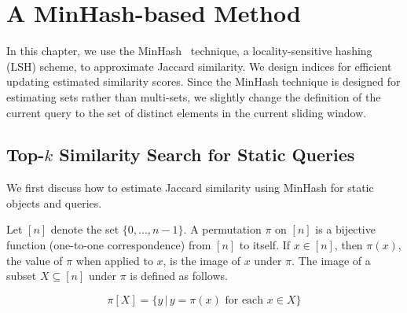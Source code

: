 
%
%

\chapter{A MinHash-based Method}
\label{ch:hashing}

In this chapter, we use the MinHash~\cite{Broder97} technique, a locality-sensitive hashing (LSH) scheme, to approximate Jaccard similarity. We design indices for efficient updating estimated similarity scores. Since the MinHash technique is designed for estimating sets rather than multi-sets, we slightly change the definition of the current query to the set of distinct elements in the current sliding window. 

\section{Top-$k$ Similarity Search for Static Queries}\label{sec:static-minHash}

We first discuss how to estimate Jaccard similarity using MinHash for static objects and queries. 



\begin{definition}\label{def:permutation}
Let $[n]$ denote the set $\{0,\dots,n-1\}$. A permutation $\pi$ on $[n]$ is a bijective function (one-to-one correspondence) from $[n]$ to itself. If $x \in [n]$, then $\pi(x)$, the value of $\pi$ when applied to $x$, is the image of $x$ under $\pi$. The image of a subset $X \subseteq [n]$ under $\pi$ is defined as follows.

$$\pi[X] = \{y\,|\,y=\pi(x) \text{ for each } x \in X\}$$



\end{definition}


